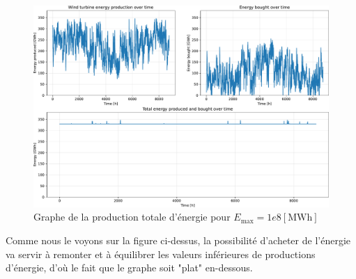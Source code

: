 \documentclass{article}
\begin{document}
\begin{figure}[ht!]
    \centering
    \includegraphics[scale=0.3]{Images/Partie_1/Q2/energy_produced_and_bought.pdf}
    \caption{Graphe de la production totale d'énergie pour $E_{\text{max}} = 1e8 [\mathrm{MWh}]$}
    \label{fig:total_energy_produced_and_bought_Q2}
\end{figure}
Comme nous le voyons sur la figure ci-dessus, la possibilité d'acheter de l'énergie va servir à remonter et à équilibrer les valeurs inférieures de productions d'énergie, d'où le fait que le graphe soit "plat" en-dessous.
\end{document}
